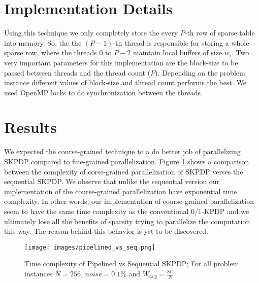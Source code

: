 \section{Implementation Details} 
Using this technique we only completely store the every $P$-th row of sparse table into memory. So, the the $(P-1)$-th thread is responsible for storing a whole sparse row, where the threads 0 to $P-2$ maintain local buffers of size $w_i$. Two very important parameters for this implementation are the block-size to be passed between threads and the thread count ($P$). Depending on the problem instance different values of block-size and thread count performs the best. We used OpenMP locks to do synchronization between the threads.


\section{Results}
We expected the course-grained technique to a do better job of parallelizing SKPDP compared to fine-grained parallelization. Figure \ref{fig:pipelined_vs_seq} shows a comparison between the complexity of corse-grained parallelization of SKPDP verses the sequential SKPDP. We observe that unlike the sequential version our implementation of the course-grained parallelization have exponential time complexity. In other words, our implementation of course-grained parallelization seem to have the same time complexity as the conventional 0/1-KPDP and we ultimately lose all the benefits of sparsity trying to parallelize the computation this way. The reason behind this behavior is yet to be discovered.

\begin{figure}[htbp]
\centerline{\texttt{[image: images/pipelined\_vs\_seq.png]}}
\caption{Time complexity of Pipelined vs Sequential SKPDP; For all problem instances $N=256$, $noise=0.1\%$ and $W_{avg}=\frac{8C}{N}$}
\label{fig:pipelined_vs_seq}
\end{figure}